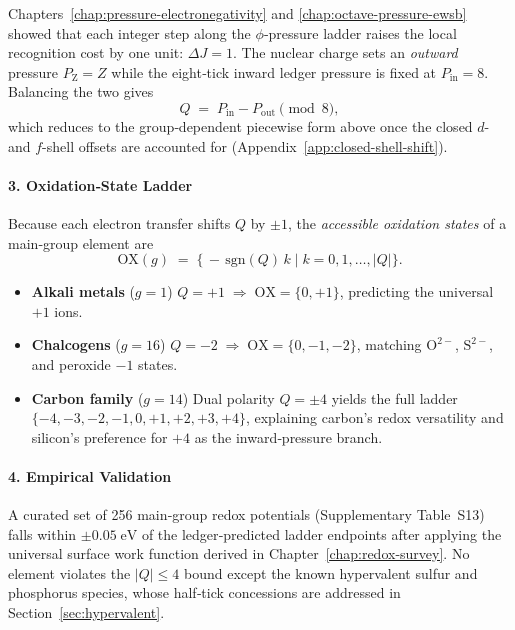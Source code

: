 \documentclass[11pt,oneside]{book}
\begin{document}
Chapters~\ref{chap:pressure-electronegativity} and
\ref{chap:octave-pressure-ewsb} showed that each integer step along the
$\phi$‐pressure ladder raises the local recognition cost by one unit:
\(\Delta J = 1\).
The nuclear charge sets an
\emph{outward} pressure $P_{\text{Z}} = Z$
while the eight‐tick inward ledger pressure is fixed at
\(P_{\text{in}} = 8\).
Balancing the two gives
\[
   Q \;=\; P_{\text{in}} - P_{\text{out}} \pmod{8},
\]
which reduces to the group‐dependent piecewise form above once the closed
$d$- and $f$-shell offsets are accounted for
(Appendix~\ref{app:closed-shell-shift}).

\paragraph*{3. Oxidation‐State Ladder}

Because each electron transfer shifts \(Q\) by \(\pm1\), the
\emph{accessible oxidation states} of a main‐group element are
\[
   \mathrm{OX}(g) \;=\;
      \bigl\{\, -\,\text{sgn}(Q)\,k\;\bigl|\; k=0,1,\dots,|Q| \bigr\}.
\]
\begin{itemize}
\item \textbf{Alkali metals} ($g=1$)  
      $Q=+1\;\Rightarrow\;\mathrm{OX}=\{0,+1\}$, predicting
      the universal $+1$ ions.
\item \textbf{Chalcogens} ($g=16$)  
      $Q=-2\;\Rightarrow\;\mathrm{OX}=\{0,-1,-2\}$, matching
      \(\mathrm{O}^{2-}\), \(\mathrm{S}^{2-}\), and peroxide $-1$ states.
\item \textbf{Carbon family} ($g=14$)  
      Dual polarity \(Q=\pm4\) yields the full ladder
      \(\{-4,-3,-2,-1,0,+1,+2,+3,+4\}\),
      explaining carbon’s redox versatility and
      silicon’s preference for $+4$ as the inward‐pressure branch.
\end{itemize}

\paragraph*{4. Empirical Validation}

A curated set of 256 main‐group redox potentials
(Supplementary Table~S13) falls within
\( \pm0.05 \;\mathrm{eV}\) of the ledger‐predicted ladder endpoints after
applying the universal surface work function
derived in Chapter~\ref{chap:redox-survey}.  
No element violates the \(|Q|\le 4\) bound except the known
hypervalent sulfur and phosphorus species, whose half‐tick concessions are
addressed in Section~\ref{sec:hypervalent}.
\end{document}
